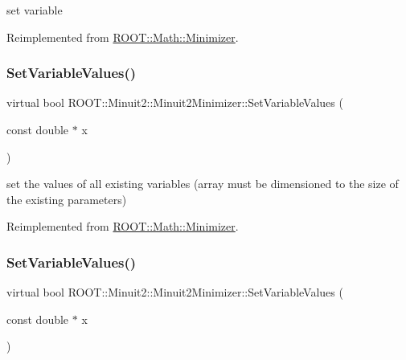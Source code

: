 set variable 



Reimplemented from \mbox{\hyperlink{classROOT_1_1Math_1_1Minimizer_a47e9a16c7a0b4ecfe769ee4be048d5c3}{R\+O\+O\+T\+::\+Math\+::\+Minimizer}}.

\mbox{\label{classROOT_1_1Minuit2_1_1Minuit2Minimizer_a9511e9711f3d1505556af30046c87d03}} 
\subsubsection{\texorpdfstring{SetVariableValues()}{SetVariableValues()}\hspace{0.1cm}{\footnotesize\ttfamily [1/2]}}
{\footnotesize\ttfamily virtual bool R\+O\+O\+T\+::\+Minuit2\+::\+Minuit2\+Minimizer\+::\+Set\+Variable\+Values (\begin{DoxyParamCaption}\item[{const double $\ast$}]{x }\end{DoxyParamCaption})\hspace{0.3cm}{\ttfamily [virtual]}}



set the values of all existing variables (array must be dimensioned to the size of the existing parameters) 



Reimplemented from \mbox{\hyperlink{classROOT_1_1Math_1_1Minimizer_ac8368efbd59da8e0b8bc0a0966309609}{R\+O\+O\+T\+::\+Math\+::\+Minimizer}}.

\mbox{\label{classROOT_1_1Minuit2_1_1Minuit2Minimizer_a9511e9711f3d1505556af30046c87d03}} 
\subsubsection{\texorpdfstring{SetVariableValues()}{SetVariableValues()}\hspace{0.1cm}{\footnotesize\ttfamily [2/2]}}
{\footnotesize\ttfamily virtual bool R\+O\+O\+T\+::\+Minuit2\+::\+Minuit2\+Minimizer\+::\+Set\+Variable\+Values (\begin{DoxyParamCaption}\item[{const double $\ast$}]{x }\end{DoxyParamCaption})\hspace{0.3cm}{\ttfamily [virtual]}}



